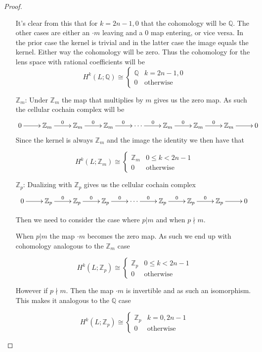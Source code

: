 \documentclass[10pt]{article}
\newcommand{\bb}[1]{\mathbb{#1}}
\theoremstyle{remark}
\begin{document}
\begin{proof}
\begin{itemize}
    It's clear from this that for $k=2n-1,0$ that the cohomology will be $\bb{Q}$. The
    other cases are either an $\cdot m$ leaving and a $0$ map entering, or vice versa.
    In the prior case the kernel is trivial and in the latter case the image equals the
    kernel. Either way the cohomology will be zero. Thus the cohomology for the lens
    space with rational coefficients will be
    \[
      H^k(L;\bb{Q}) \cong  
      \left\{
        \begin{array}{ll}
          \bb{Q} & k=2n-1,0\\
          0 & \text{otherwise}
        \end{array}
      \right.
    \]
  \item[$\bb{Z}_m$:] Under $\bb{Z}_m$ the map that multiplies by $m$ gives us
    the zero map. As such the cellular cochain complex will be
    \[
      \xymatrix{
        0 \ar[r] & \bb{Z}_m \ar[r]^0 & \bb{Z}_m \ar[r]^0 & \bb{Z}_m \ar[r]^0 & \cdots \ar[r]^0 & \bb{Z}_m \ar[r]^0 & \bb{Z}_m \ar[r]^0 & \bb{Z}_m \ar[r] & 0
      }
    \]
    Since the kernel is always $\bb{Z}_m$ and the image the identity we then have that

    \[
      H^k(L;\bb{Z}_m) \cong  
      \left\{
        \begin{array}{ll}
          \bb{Z}_m & 0\leq k < 2n-1\\
          0 & \text{otherwise}
        \end{array}
      \right.
    \]
  \item[$\bb{Z}_p$:]
    Dualizing with $\bb{Z}_p$ gives us the cellular cochain complex
    \[
      \xymatrix{
        0 \ar[r] & \bb{Z}_p \ar[r]^0 & \bb{Z}_p \ar[r]^0 & \bb{Z}_p \ar[r]^0 & \cdots \ar[r]^0 & \bb{Z}_p \ar[r]^0 & \bb{Z}_p \ar[r]^0 & \bb{Z}_p \ar[r] & 0
      }
    \]

    Then we need to consider the case where $p|m$ and when $p\nmid m$.

    When $p|m$ the map $\cdot m$ becomes the zero map. As such we end up
    with cohomology analogous to the $\bb{Z}_m$ case

    \[
      H^k(L;\bb{Z}_p) \cong  
      \left\{
        \begin{array}{ll}
          \bb{Z}_p & 0\leq k<2n-1\\
          0 & \text{otherwise}
        \end{array}
      \right.
    \]

    However if $p\nmid m$. Then the map $\cdot m$ is invertible and as such an
    isomorphism. This makes it analogous to the $\bb{Q}$ case

    \[
      H^k(L;\bb{Z}_p) \cong  
      \left\{
        \begin{array}{ll}
          \bb{Z}_p & k=0,2n-1\\
          0 & \text{otherwise}
        \end{array}
      \right.
    \]
  \end{itemize}
\end{proof}
\end{document}
